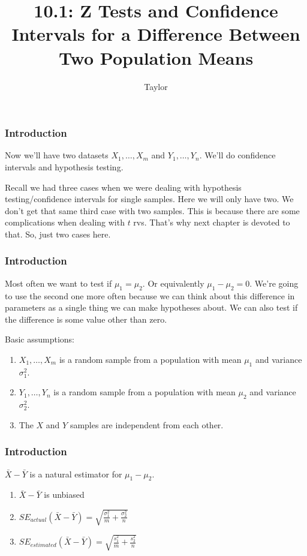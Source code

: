 \documentclass{beamer}
\title["10.1"]{10.1: Z Tests and Confidence Intervals for a Difference Between Two Population Means}
\author{Taylor}
\institute[UVA] 
{
University of Virginia \\
\medskip
\textit{} 
}
\date{}
\begin{document}

\begin{frame}
\titlepage 
\end{frame}
\begin{frame}
\frametitle{Introduction}

Now we'll have two datasets $X_1, \ldots, X_m$ and $Y_1, \ldots, Y_n$. We'll do confidence intervals and hypothesis testing.
\newline

Recall we had three cases when we were dealing with hypothesis testing/confidence intervals for single samples. Here we will only have two. We don't get that same third case with two samples. This is because there are some complications when dealing with $t$ rvs. That's why next chapter is devoted to that. So, just two cases here.

\end{frame}
\begin{frame}
\frametitle{Introduction}

Most often we want to test if $\mu_1 = \mu_2$. Or equivalently $\mu_1 - \mu_2 = 0$. We're going to use the second one more often because we can think about this difference in parameters as a single thing we can make hypotheses about. We can also test if the difference is some value other than zero.
\newline

Basic assumptions:
\begin{enumerate}
\item $X_1, \ldots, X_m$ is a random sample from a population with mean $\mu_1$ and variance $\sigma^2_1$.
\item $Y_1, \ldots, Y_n$ is a random sample from a population with mean $\mu_2$ and variance $\sigma^2_2$.
\item The $X$ and $Y$ samples are independent from each other.
\end{enumerate}

\end{frame}
\begin{frame}
\frametitle{Introduction}

$\bar{X} - \bar{Y}$ is a natural estimator for $\mu_1 - \mu_2$.
\newline


\begin{enumerate}
\item $\bar{X} - \bar{Y}$ is unbiased
\item $SE_{actual}(\bar{X} - \bar{Y}) = \sqrt{\frac{\sigma_1^2}{m}+\frac{\sigma_2^2}{n} } $
\item $SE_{estimated}(\bar{X} - \bar{Y}) = \sqrt{\frac{s_1^2}{m}+\frac{s_2^2}{n} } $
\end{enumerate}


\end{frame}
\end{document}
